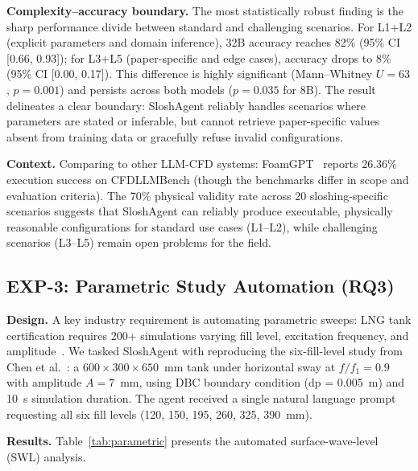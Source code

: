 \documentclass[11pt]{article}
\begin{document}
\textbf{Complexity--accuracy boundary.} The most statistically robust finding is the sharp performance divide between standard and challenging scenarios. For L1+L2 (explicit parameters and domain inference), 32B accuracy reaches 82\% (95\% CI [0.66, 0.93]); for L3+L5 (paper-specific and edge cases), accuracy drops to 8\% (95\% CI [0.00, 0.17]). This difference is highly significant (Mann--Whitney $U = 63$, $p = 0.001$) and persists across both models ($p = 0.035$ for 8B). The result delineates a clear boundary: SloshAgent reliably handles scenarios where parameters are stated or inferable, but cannot retrieve paper-specific values absent from training data or gracefully refuse invalid configurations.

\textbf{Context.} Comparing to other LLM-CFD systems: FoamGPT~\citep{foamgpt2025} reports 26.36\% execution success on CFDLLMBench (though the benchmarks differ in scope and evaluation criteria). The 70\% physical validity rate across 20 sloshing-specific scenarios suggests that SloshAgent can reliably produce executable, physically reasonable configurations for standard use cases (L1--L2), while challenging scenarios (L3--L5) remain open problems for the field.

\subsection{EXP-3: Parametric Study Automation (RQ3)}

\textbf{Design.} A key industry requirement is automating parametric sweeps: LNG tank certification requires 200+ simulations varying fill level, excitation frequency, and amplitude~\citep{isope2012sloshing}. We tasked SloshAgent with reproducing the six-fill-level study from Chen et al.~\citep{chen2018sloshing}: a $600 \times 300 \times 650$~mm tank under horizontal sway at $f/f_1 = 0.9$ with amplitude $A = 7$~mm, using DBC boundary condition (dp = 0.005~m) and 10~s simulation duration. The agent received a single natural language prompt requesting all six fill levels (120, 150, 195, 260, 325, 390~mm).

\textbf{Results.} Table~\ref{tab:parametric} presents the automated surface-wave-level (SWL) analysis.
\end{document}
